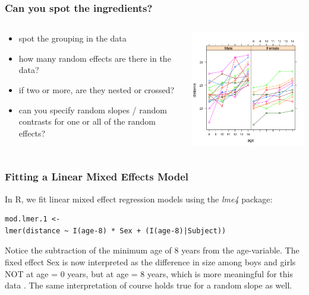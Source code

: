 \documentclass{beamer}
\begin{document}
\begin{frame}
    \frametitle{Can you spot the ingredients?}
    \begin{columns}
        \begin{column}{0.5\textwidth}
            \begin{itemize}
                \item spot the grouping in the data
                \item how many random effects are there in the data?
                \item if two or more, are they nested or crossed?
                \item can you specify random slopes / random contrasts for one or all of the random effects?
            \end{itemize}
        \end{column}
        \begin{column}{0.5\textwidth}
            \includegraphics[width=\textwidth]{lectures/day_6_praxis_and_fitting_of_mems/figures/unnamed-chunk-14-1.png}
        \end{column}
    \end{columns}
\end{frame}

\begin{frame}[fragile]
    \frametitle{Fitting a Linear Mixed Effects Model}
    In R, we fit linear mixed effect regression models using the \textit{lme4} package:
    \begin{Verbatim}[frame=single]
mod.lmer.1 <- 
lmer(distance ~ I(age-8) * Sex + (I(age-8)|Subject))
    \end{Verbatim}
    Notice the subtraction of the minimum age of 8 years from the age-variable. The fixed effect Sex is now interpreted as the difference in size among boys and girls NOT at age = 0 years, but at age = 8 years, which is more meaningful for this data .
    The same interpretation of course holds true for a random slope as well.
\end{frame}
\end{document}
